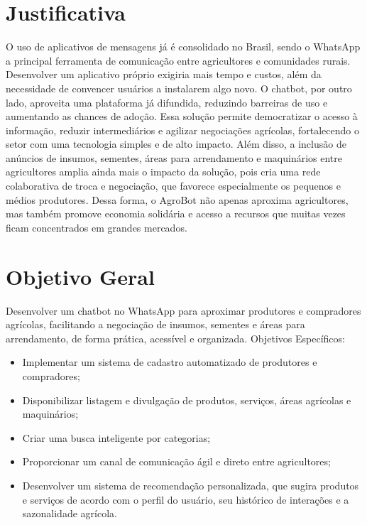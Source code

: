 \documentclass[
  article,
  a4paper,
  12pt,
  fleqn,
  oneside,
  chapter = TITLE,
  section = TITLE,
]{abntex2}
\begin{document}
\section{Justificativa}

O uso de aplicativos de mensagens já é consolidado no Brasil, sendo o WhatsApp a principal ferramenta de comunicação entre agricultores e comunidades rurais. Desenvolver um aplicativo próprio exigiria mais tempo e custos, além da necessidade de convencer usuários a instalarem algo novo.
O chatbot, por outro lado, aproveita uma plataforma já difundida, reduzindo barreiras de uso e aumentando as chances de adoção. Essa solução permite democratizar o acesso à informação, reduzir intermediários e agilizar negociações agrícolas, fortalecendo o setor com uma tecnologia simples e de alto impacto.
Além disso, a inclusão de anúncios de insumos, sementes, áreas para arrendamento e maquinários entre agricultores amplia ainda mais o impacto da solução, pois cria uma rede colaborativa de troca e negociação, que favorece especialmente os pequenos e médios produtores. Dessa forma, o AgroBot não apenas aproxima agricultores, mas também promove economia solidária e acesso a recursos que muitas vezes ficam concentrados em grandes mercados.



\section{Objetivo Geral}

Desenvolver um chatbot no WhatsApp para aproximar produtores e compradores agrícolas, facilitando a negociação de insumos, sementes e áreas para arrendamento, de forma prática, acessível e organizada.
Objetivos Específicos:

\begin{itemize}
  \item Implementar um sistema de cadastro automatizado de produtores e compradores;
  \item Disponibilizar listagem e divulgação de produtos, serviços, áreas agrícolas e maquinários;
  \item Criar uma busca inteligente por categorias;
  \item Proporcionar um canal de comunicação ágil e direto entre agricultores;
  \item Desenvolver um sistema de recomendação personalizada, que sugira produtos e serviços de acordo com o perfil do usuário, seu histórico de interações e a sazonalidade agrícola.
\end{itemize}
\end{document}
